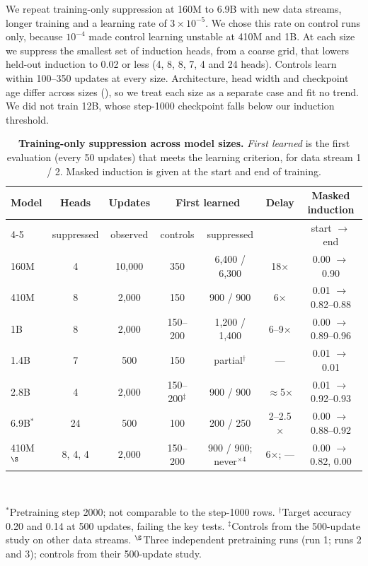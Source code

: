 We repeat training-only suppression at 160M to 6.9B with new data streams, longer
training and a learning rate of $3\times10^{-5}$. We chose this rate on control runs
only, because $10^{-4}$ made control learning unstable at 410M and 1B. At each size
we suppress the smallest set of induction heads, from a coarse grid, that lowers
held-out induction to 0.02 or less (4, 8, 8, 7, 4 and 24 heads). Controls learn
within 100--350 updates at every size. Architecture, head width and checkpoint age
differ across sizes (), so we treat each size as a separate case
and fit no trend. We did not train 12B, whose step-1000 checkpoint falls below our
induction threshold.

\begin{table}[t]
\centering\small
\caption{\textbf{Training-only suppression across model sizes.} \emph{First learned}
is the first evaluation (every 50 updates) that meets the learning criterion, for
data stream 1 / 2. Masked induction is given at the start and end of training.}
\label{tab:scaling}
\setlength{\tabcolsep}{3.5pt}
\begin{tabular}{@{}lcccccc@{}}
\toprule
Model & Heads & Updates & \multicolumn{2}{c}{First learned} & Delay & Masked induction \\
\cmidrule(lr){4-5}
 & suppressed & observed & controls & suppressed & & start $\to$ end \\
\midrule
160M & 4 & 10,000 & 350 & 6,400 / 6,300 & 18$\times$ & 0.00 $\to$ 0.90 \\
410M & 8 & 2,000 & 150 & 900 / 900 & 6$\times$ & 0.01 $\to$ 0.82--0.88 \\
1B & 8 & 2,000 & 150--200 & 1,200 / 1,400 & 6--9$\times$ & 0.00 $\to$ 0.89--0.96 \\
1.4B & 7 & 500 & 150 & partial$^\dagger$ & --- & 0.01 $\to$ 0.01 \\
2.8B & 4 & 2,000 & 150--200$^\ddagger$ & 900 / 900 & $\approx$5$\times$ & 0.01 $\to$ 0.92--0.93 \\
6.9B$^\ast$ & 24 & 500 & 100 & 200 / 250 & 2--2.5$\times$ & 0.00 $\to$ 0.88--0.92 \\
410M$^\S$ & 8, 4, 4 & 2,000 & 150--200 & 900 / 900; never$^{\times 4}$ & 6$\times$; --- & 0.00 $\to$ 0.82, 0.00 \\
\bottomrule
\end{tabular}\\[2pt]
\raggedright\footnotesize $^\ast$Pretraining step 2000; not comparable to the step-1000 rows. $^\dagger$Target accuracy 0.20 and 0.14 at 500 updates, failing the key tests. $^\ddagger$Controls from the 500-update study on other data streams. $^\S$Three independent pretraining runs (run 1; runs 2 and 3); controls from their 500-update study.
\end{table}

